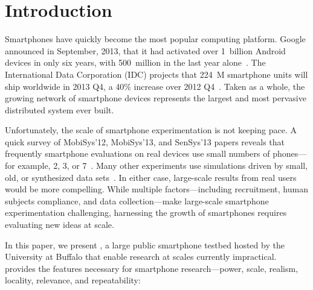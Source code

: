 \section{Introduction}
\label{sec-introduction}

Smartphones have quickly become the most popular computing platform. Google
announced in September, 2013, that it had activated over 1~billion Android
devices in only six years, with 500~million in the last year
alone~\cite{google-total-activations}. The International Data Corporation
(IDC) projects that 224~M smartphone units will ship worldwide in 2013 Q4, a
40\% increase over 2012 Q4~\cite{idc-smartphone-growth}. Taken as a whole,
the growing network of smartphone devices represents the largest and most
pervasive distributed system ever built.

Unfortunately, the scale of smartphone experimentation is not keeping pace. A
quick survey of MobiSys'12, MobiSys'13, and SenSys'13 papers reveals that
frequently smartphone evaluations on real devices use small numbers of
phones---for example, 2, 3, or 7~\cite{nowar-mobisys12, wang:mobisys:2013,
hao:sensys:2013}. Many other experiments use simulations driven by small,
old, or synthesized data sets~\cite{falcon-mobisys12, ace-mobisys12,
humanmobility-mobisys12}. In either case, large-scale results from real users
would be more compelling. While multiple factors---including recruitment,
human subjects compliance, and data collection---make large-scale smartphone
experimentation challenging, harnessing the growth of smartphones requires
evaluating new ideas at scale.

\newpage

In this paper, we present \PhoneLab{}, a large public smartphone testbed
hosted by the University at Buffalo that enable research at scales currently
impractical. \PhoneLab{} provides the features necessary for smartphone
research---power, scale, realism, locality, relevance, and repeatability:

